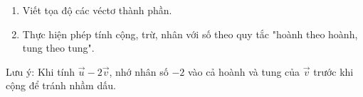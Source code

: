 \begin{enumerate}
\item Viết tọa độ các véctơ thành phần.
\item Thực hiện phép tính cộng, trừ, nhân với số theo quy tắc "hoành theo hoành, tung theo tung".
\end{enumerate}
Lưu ý: Khi tính $\overrightarrow{u} - 2\overrightarrow{v}$, nhớ nhân số $-2$ vào cả hoành và tung của $\overrightarrow{v}$ trước khi cộng để tránh nhầm dấu.
